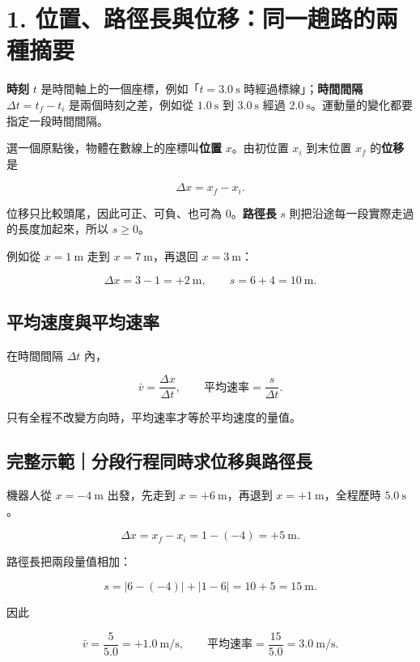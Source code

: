 \documentclass[11pt,a4paper]{article}
\begin{document}
\section{1. 位置、路徑長與位移：同一趟路的兩種摘要}\label{ux4f4dux7f6eux8defux5f91ux9577ux8207ux4f4dux79fbux540cux4e00ux8d9fux8defux7684ux5169ux7a2eux6458ux8981}

\textbf{時刻} \(t\) 是時間軸上的一個座標，例如「\(t=3.0\ \mathrm s\) 時經過標線」；\textbf{時間間隔} \(\Delta t=t_f-t_i\) 是兩個時刻之差，例如從 \(1.0\ \mathrm s\) 到 \(3.0\ \mathrm s\) 經過 \(2.0\ \mathrm s\)。運動量的變化都要指定一段時間間隔。

選一個原點後，物體在數線上的座標叫\textbf{位置} \(x\)。由初位置 \(x_i\) 到末位置 \(x_f\) 的\textbf{位移}是

\[
\boxed{\Delta x=x_f-x_i}.
\]

位移只比較頭尾，因此可正、可負、也可為 0。\textbf{路徑長} \(s\) 則把沿途每一段實際走過的長度加起來，所以 \(s\ge0\)。

例如從 \(x=1\ \mathrm{m}\) 走到 \(x=7\ \mathrm{m}\)，再退回 \(x=3\ \mathrm{m}\)：

\[
\Delta x=3-1=+2\ \mathrm{m},\qquad s=6+4=10\ \mathrm{m}.
\]

\subsection{平均速度與平均速率}\label{ux5e73ux5747ux901fux5ea6ux8207ux5e73ux5747ux901fux7387}

在時間間隔 \(\Delta t\) 內，

\[
\boxed{\bar v=\frac{\Delta x}{\Delta t}},
\qquad
\boxed{\text{平均速率}=\frac{s}{\Delta t}}.
\]

只有全程不改變方向時，平均速率才等於平均速度的量值。

\begin{HandoutWorkedExample}

\subsection{完整示範｜分段行程同時求位移與路徑長}\label{ux5b8cux6574ux793aux7bc4ux5206ux6bb5ux884cux7a0bux540cux6642ux6c42ux4f4dux79fbux8207ux8defux5f91ux9577}

機器人從 \(x=-4\ \mathrm m\) 出發，先走到 \(x=+6\ \mathrm m\)，再退到 \(x=+1\ \mathrm m\)，全程歷時 \(5.0\ \mathrm s\)。

\[
\Delta x=x_f-x_i=1-(-4)=+5\ \mathrm m.
\]

路徑長把兩段量值相加：

\[
s=|6-(-4)|+|1-6|=10+5=15\ \mathrm m.
\]

因此

\[
\bar v=\frac{5}{5.0}=+1.0\ \mathrm{m/s},\qquad
\text{平均速率}=\frac{15}{5.0}=3.0\ \mathrm{m/s}.
\]

\end{HandoutWorkedExample}
\end{document}
